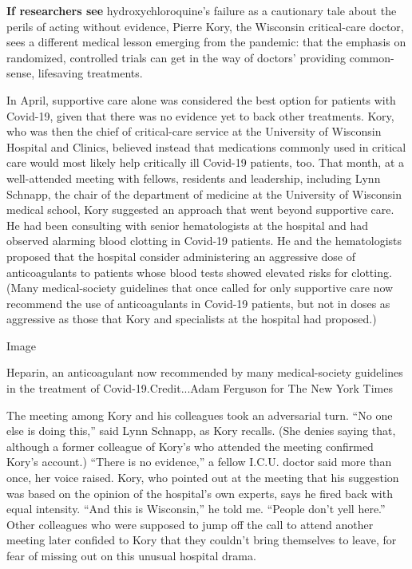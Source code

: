 \textbf{If researchers see} hydroxychloroquine's failure as a cautionary
tale about the perils of acting without evidence, Pierre Kory, the
Wisconsin critical-care doctor, sees a different medical lesson emerging
from the pandemic: that the emphasis on randomized, controlled trials
can get in the way of doctors' providing common-sense, lifesaving
treatments.

In April, supportive care alone was considered the best option for
patients with Covid-19, given that there was no evidence yet to back
other treatments. Kory, who was then the chief of critical-care service
at the University of Wisconsin Hospital and Clinics, believed instead
that medications commonly used in critical care would most likely help
critically ill Covid-19 patients, too. That month, at a well-attended
meeting with fellows, residents and leadership, including Lynn Schnapp,
the chair of the department of medicine at the University of Wisconsin
medical school, Kory suggested an approach that went beyond supportive
care. He had been consulting with senior hematologists at the hospital
and had observed alarming blood clotting in Covid-19 patients. He and
the hematologists proposed that the hospital consider administering an
aggressive dose of anticoagulants to patients whose blood tests showed
elevated risks for clotting. (Many medical-society guidelines that once
called for only supportive care now recommend the use of anticoagulants
in Covid-19 patients, but not in doses as aggressive as those that Kory
and specialists at the hospital had proposed.)

Image

Heparin, an anticoagulant now recommended by many medical-society
guidelines in the treatment of Covid-19.Credit...Adam Ferguson for The
New York Times

The meeting among Kory and his colleagues took an adversarial turn. ``No
one else is doing this,'' said Lynn Schnapp, as Kory recalls. (She
denies saying that, although a former colleague of Kory's who attended
the meeting confirmed Kory's account.) ``There is no evidence,'' a
fellow I.C.U. doctor said more than once, her voice raised. Kory, who
pointed out at the meeting that his suggestion was based on the opinion
of the hospital's own experts, says he fired back with equal intensity.
``And this is Wisconsin,'' he told me. ``People don't yell here.'' Other
colleagues who were supposed to jump off the call to attend another
meeting later confided to Kory that they couldn't bring themselves to
leave, for fear of missing out on this unusual hospital drama.

